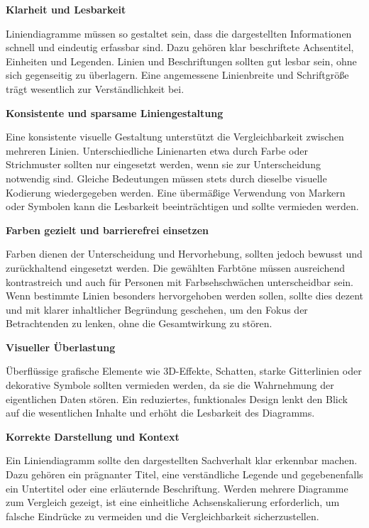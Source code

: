 \item
\textbf{Klarheit und Lesbarkeit}

Liniendiagramme müssen so gestaltet sein, dass die dargestellten Informationen schnell und eindeutig erfassbar sind.
Dazu gehören klar beschriftete Achsentitel, Einheiten und Legenden.
Linien und Beschriftungen sollten gut lesbar sein, ohne sich gegenseitig zu überlagern.
Eine angemessene Linienbreite und Schriftgröße trägt wesentlich zur Verständlichkeit bei.

\item
\textbf{Konsistente und sparsame Liniengestaltung}

Eine konsistente visuelle Gestaltung unterstützt die Vergleichbarkeit zwischen mehreren Linien.
Unterschiedliche Linienarten etwa durch Farbe oder Strichmuster sollten nur eingesetzt werden, wenn sie zur Unterscheidung notwendig sind.
Gleiche Bedeutungen müssen stets durch dieselbe visuelle Kodierung wiedergegeben werden.
Eine übermäßige Verwendung von Markern oder Symbolen kann die Lesbarkeit beeinträchtigen und sollte vermieden werden.

\item
\textbf{Farben gezielt und barrierefrei einsetzen}

Farben dienen der Unterscheidung und Hervorhebung, sollten jedoch bewusst und zurückhaltend eingesetzt werden.
Die gewählten Farbtöne müssen ausreichend kontrastreich und auch für Personen mit Farbsehschwächen unterscheidbar sein.
Wenn bestimmte Linien besonders hervorgehoben werden sollen, sollte dies dezent und mit klarer inhaltlicher Begründung geschehen, um den Fokus der Betrachtenden zu lenken, ohne die Gesamtwirkung zu stören.

\item
\textbf{Visueller Überlastung}

Überflüssige grafische Elemente wie 3D-Effekte, Schatten, starke Gitterlinien oder dekorative Symbole sollten vermieden werden, da sie die Wahrnehmung der eigentlichen Daten stören.
Ein reduziertes, funktionales Design lenkt den Blick auf die wesentlichen Inhalte und erhöht die Lesbarkeit des Diagramms.

\item
\textbf{Korrekte Darstellung und Kontext}

Ein Liniendiagramm sollte den dargestellten Sachverhalt klar erkennbar machen.
Dazu gehören ein prägnanter Titel, eine verständliche Legende und gegebenenfalls ein Untertitel oder eine erläuternde Beschriftung.
Werden mehrere Diagramme zum Vergleich gezeigt, ist eine einheitliche Achsenskalierung erforderlich, um falsche Eindrücke zu vermeiden und die Vergleichbarkeit sicherzustellen.

